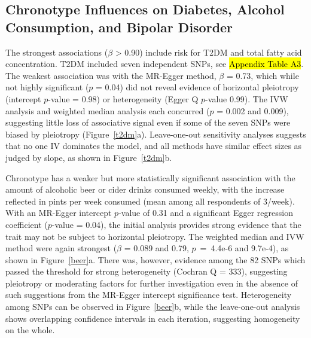 \documentclass[genes,article,accept,moreauthors,pdftex]{Definitions/mdpi}
\begin{document}
\subsection{Chronotype Influences on Diabetes, Alcohol Consumption, and Bipolar Disorder}
The strongest associations ($\beta$ > 0.90) include risk for T2DM and total fatty acid concentration. T2DM included seven independent SNPs, see {\hl{Appendix Table A3}}. The weakest association was with the MR-Egger method, $\beta$ = 0.73, which while not highly significant ($p$ = 0.04) did not reveal evidence of horizontal pleiotropy (intercept $p$-value = 0.98) or heterogeneity (Egger Q $p$-value 0.99). The IVW analysis and weighted median analysis each concurred ($p$ = 0.002 and 0.009), suggesting little loss of associative signal even if some of the seven SNPs were biased by pleiotropy (Figure~\ref{t2dm}a). Leave-one-out sensitivity analyses suggests that no one IV dominates the model, and all methods have similar effect sizes as judged by slope, as shown in Figure~\ref{t2dm}b. 

Chronotype has a weaker but more statistically significant association with the amount of alcoholic beer or cider drinks consumed weekly, with the increase reflected in pints per week consumed (mean among all respondents of 3/week). With an MR-Egger intercept $p$-value of 0.31 and a significant Egger regression coefficient ($p$-value = 0.04), the initial analysis provides strong evidence that the trait may not be subject to horizontal pleiotropy. The weighted median and IVW method were again strongest ($\beta$ = 0.089 and 0.79, \mbox{$p$ = 4.4e-6} and 9.7e-4), as shown in Figure~\ref{beer}a. There was, however, evidence among the 82 SNPs which passed the threshold for strong heterogeneity (Cochran Q = 333), suggesting pleiotropy or moderating factors for further investigation even in the absence of such suggestions from the MR-Egger intercept significance test. Heterogeneity among SNPs can be observed in Figure~\ref{beer}b, while the leave-one-out analysis shows overlapping confidence intervals in each iteration, suggesting homogeneity on the whole.
\end{document}
